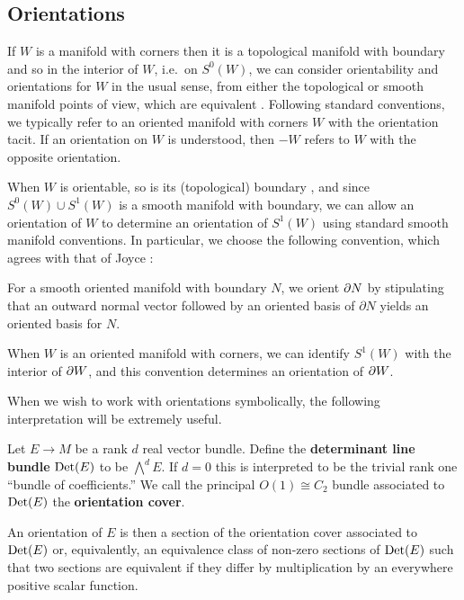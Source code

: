 \subsection{Orientations}\label{S: orientations}

If $W$ is a manifold with corners then it is a topological manifold with boundary and so in the interior of $W$, i.e.\ on $S^0(W)$, we can consider orientability and orientations for $W$ in the usual sense, from either the topological or smooth manifold points of view, which are equivalent \cite[Theorem VI.7.15]{Bred97}.
Following standard conventions, we typically refer to an oriented manifold with corners $W$ with the orientation tacit.
If an orientation on $W$ is understood, then $-W$ refers to $W$ with the opposite orientation.

When $W$ is orientable, so is its (topological) boundary \cite[Lemma~6.9.1]{Bred97}, and since $S^0(W)\cup S^1(W)$ is a smooth manifold with boundary, we can allow an orientation of $W$ to determine an orientation of $S^1(W)$ using standard smooth manifold conventions.
In particular, we choose the following convention, which agrees with that of Joyce \cite[Convention~7.2.a]{Joy12}:

\begin{convention}\label{Con: oriented boundary}
	For a smooth oriented manifold with boundary $N$, we orient $\partial N$ by stipulating that an outward normal vector followed by an oriented basis of $\partial N$ yields an oriented basis for $N$.
\end{convention}

When $W$ is an oriented manifold with corners, we can identify $S^1(W)$ with the interior of $\partial W$, and this convention determines an orientation of $\partial W$.

When we wish to work with orientations symbolically, the following interpretation will be extremely useful.

\begin{definition}\label{D: det bundle}
	Let $E \to M$ be a rank $d$ real vector bundle.
	Define the {\bf determinant line bundle}
	${\rm Det}(E)$ to be $\bigwedge^d E$.
	If $d = 0$ this is interpreted to be the trivial rank one ``bundle of coefficients.''
	We call the principal $O(1) \cong C_2$ bundle associated to ${\rm Det}(E)$ the {\bf orientation cover}.

	An orientation of $E$ is then a section of the orientation cover associated to ${\rm Det}(E)$ or, equivalently, an equivalence class of non-zero sections of ${\rm Det}(E)$ such that two sections are equivalent if they differ by multiplication by an everywhere positive scalar function.
\end{definition}

